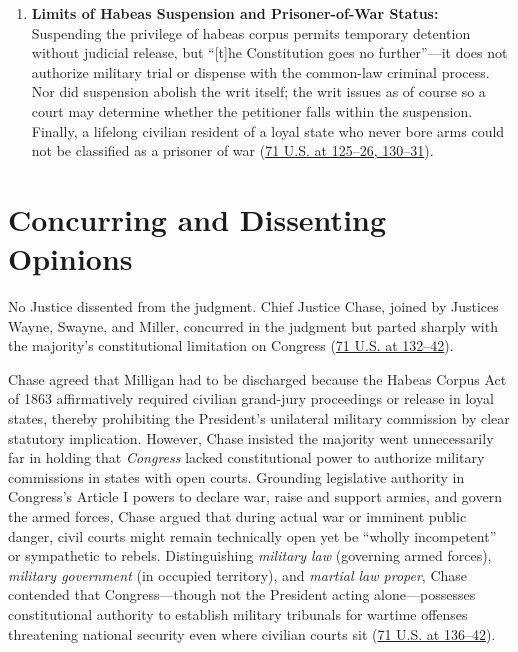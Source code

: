 \documentclass[12pt]{article}
\begin{document}
\begin{enumerate}
  \item \textbf{Limits of Habeas Suspension and Prisoner-of-War Status:} Suspending the privilege of habeas corpus permits temporary detention without judicial release, but ``[t]he Constitution goes no further''---it does not authorize military trial or dispense with the common-law criminal process. Nor did suspension abolish the writ itself; the writ issues as of course so a court may determine whether the petitioner falls within the suspension. Finally, a lifelong civilian resident of a loyal state who never bore arms could not be classified as a prisoner of war (\href{https://supreme.justia.com/cases/federal/us/71/2/}{71 U.S. at 125--26, 130--31}).
\end{enumerate}

\section{Concurring and Dissenting Opinions}

No Justice dissented from the judgment. Chief Justice Chase, joined by Justices Wayne, Swayne, and Miller, concurred in the judgment but parted sharply with the majority's constitutional limitation on Congress (\href{https://supreme.justia.com/cases/federal/us/71/2/}{71 U.S. at 132--42}).

Chase agreed that Milligan had to be discharged because the Habeas Corpus Act of 1863 affirmatively required civilian grand-jury proceedings or release in loyal states, thereby prohibiting the President's unilateral military commission by clear statutory implication. However, Chase insisted the majority went unnecessarily far in holding that \textit{Congress} lacked constitutional power to authorize military commissions in states with open courts. Grounding legislative authority in Congress's Article I powers to declare war, raise and support armies, and govern the armed forces, Chase argued that during actual war or imminent public danger, civil courts might remain technically open yet be ``wholly incompetent'' or sympathetic to rebels. Distinguishing \textit{military law} (governing armed forces), \textit{military government} (in occupied territory), and \textit{martial law proper}, Chase contended that Congress---though not the President acting alone---possesses constitutional authority to establish military tribunals for wartime offenses threatening national security even where civilian courts sit (\href{https://supreme.justia.com/cases/federal/us/71/2/}{71 U.S. at 136--42}).
\end{document}
